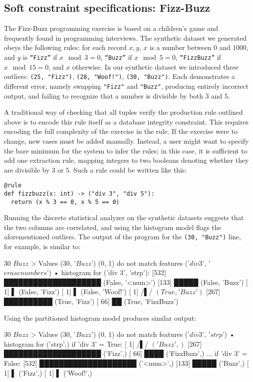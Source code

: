 \subsection{Soft constraint specifications: Fizz-Buzz}
The Fizz-Buzz programming exercise is based on a children's game and frequently found in programming interviews. The synthetic dataset we generated obeys the following rules: for each record \(x, y\), $x$ is a number between 0 and 1000, and $y$ is \texttt{``Fizz''} if \(x \mod 3 = 0\), \texttt{``Buzz''} if \(x \mod 5 = 0\), \texttt{``FizzBuzz''} if \(x \mod 15 = 0\), and \(x\) otherwise. In our synthetic dataset we introduced three outliers: \texttt{(25, "Fizz")}, \texttt{(28, "Woof!")}, \texttt{(30, "Buzz")}. Each demonstrates a different error, namely swapping \texttt{"Fizz"} and \texttt{"Buzz"}, producing entirely incorrect output, and failing to recognize that a number is divisible by both $3$ and $5$.

A traditional way of checking that all tuples verify the production rule outlined above is to encode this rule itself as a database integrity constraint. This requires encoding the full complexity of the exercise in the rule. If the exercise were to change, new cases must be added manually. Instead, a user might want to specify the bare minimum for the system to infer the rules; in this case, it is sufficient to add one extraction rule, mapping integers to two booleans denoting whether they are divisible by $3$ or $5$. Such a rule could be written like this:

\begin{verbatim}
@rule
def fizzbuzz(x: int) -> ("div 3", "div 5"):
  return (x % 3 == 0, x % 5 == 0)
\end{verbatim}

Running the discrete statistical analyzer on the synthetic datasets suggests that the two columns are correlated, and using the histogram model flags the aforementioned outliers. The output of the program for the \texttt{(30, "Buzz")} line, for example, is similar to:

\begin{lstnobreak}[gobble=2]
   $30$ $Buzz$
   > Values ($30$, '$Buzz$') (0, 1) do not match
     features ('$div 3$', '$erase numbers$')
     • histogram for ('div 3', 'strp'):
       [532] ████████████████████ (False, '<num>')
       [133] █████ (False, 'Buzz')
       [  1] ▌ (False, 'Fizz')
       [  1] ▌ (False, 'Woof!')
       [  1] /▌/ $(True, 'Buzz')$
       [267] ██████████ (True, 'Fizz')
       [ 66] ██ (True, 'FizzBuzz')
\end{lstnobreak}

Using the partitioned histogram model produces similar output:

\begin{lstnobreak}[gobble=2]
   $30$ $Buzz$
   > Values ($30$, '$Buzz$') (0, 1) do not match
     features ('$div 3$', '$strp$')
     • histogram for ('strp',) if 'div 3' = True:
       [  1] /▌/ $('Buzz',)$
       [267] ████████████████████ ('Fizz',)
       [ 66] ████ ('FizzBuzz',)
     ... if 'div 3' = False:
       [532] ████████████████████ ('<num>',)
       [133] █████ ('Buzz',)
       [  1] ▌ ('Fizz',)
       [  1] ▌ ('Woof!',)
\end{lstnobreak}
